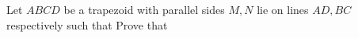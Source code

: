 Let $ABCD$ be a trapezoid with parallel sides  $M,N$ lie on lines $AD, BC$ respectively such that  Prove that 